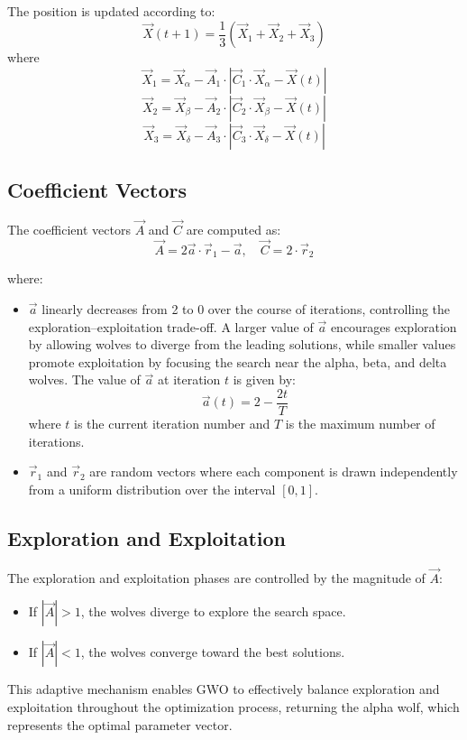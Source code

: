\documentclass[conference]{IEEEtran}
\begin{document}
The position is updated according to:
\[
\vec{X}(t+1) = \frac{1}{3} \left( \vec{X}_1 + \vec{X}_2 + \vec{X}_3 \right)
\]
where
\[
\vec{X}_1 = \vec{X}_\alpha - \vec{A}_1 \cdot \left| \vec{C}_1 \cdot \vec{X}_\alpha - \vec{X}(t) \right|
\]
\[
\vec{X}_2 = \vec{X}_\beta - \vec{A}_2 \cdot \left| \vec{C}_2 \cdot \vec{X}_\beta - \vec{X}(t) \right|
\]
\[
\vec{X}_3 = \vec{X}_\delta - \vec{A}_3 \cdot \left| \vec{C}_3 \cdot \vec{X}_\delta - \vec{X}(t) \right|
\]

\subsection*{Coefficient Vectors}

The coefficient vectors $\vec{A}$ and $\vec{C}$ are computed as:
\[
\vec{A} = 2\vec{a} \cdot \vec{r}_1 - \vec{a}, \quad \vec{C} = 2 \cdot \vec{r}_2
\]

where:
\begin{itemize}
    \item $\vec{a}$ linearly decreases from 2 to 0 over the course of iterations, controlling the exploration–exploitation trade-off. A larger value of $\vec{a}$ encourages exploration by allowing wolves to diverge from the leading solutions, while smaller values promote exploitation by focusing the search near the alpha, beta, and delta wolves. The value of $\vec{a}$ at iteration $t$ is given by:
\[
\vec{a}(t) = 2 - \frac{2t}{T}
\]
where $t$ is the current iteration number and $T$ is the maximum number of iterations.
    \item $\vec{r}_1$ and $\vec{r}_2$ are random vectors where each component is drawn independently from a uniform distribution over the interval $[0, 1]$.
\end{itemize}

\subsection*{Exploration and Exploitation}

The exploration and exploitation phases are controlled by the magnitude of $\vec{A}$:
\begin{itemize}
    \item If $|\vec{A}| > 1$, the wolves diverge to explore the search space.
    \item If $|\vec{A}| < 1$, the wolves converge toward the best solutions.
\end{itemize}

This adaptive mechanism enables GWO to effectively balance exploration and exploitation throughout the optimization process, returning the alpha wolf, which represents the optimal parameter vector.
\end{document}
